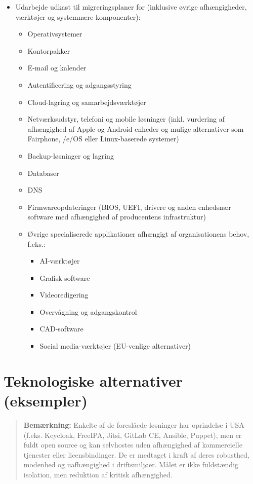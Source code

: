 \documentclass[a4paper,11pt,oneside]{book}
\def\tightlist{}
\begin{document}
\begin{itemize}
\item
  Udarbejde udkast til migreringsplaner for (inklusive øvrige
  afhængigheder, værktøjer og systemnære komponenter):

  \begin{itemize}
  \item
    Operativsystemer
  \item
    Kontorpakker
  \item
    E-mail og kalender
  \item
    Autentificering og adgangsstyring
  \item
    Cloud-lagring og samarbejdsværktøjer
  \item
    Netværksudstyr, telefoni og mobile løsninger (inkl. vurdering af
    afhængighed af Apple og Android enheder og mulige alternativer som
    Fairphone, /e/OS eller Linux-baserede systemer)
  \item
    Backup-løsninger og lagring
  \item
    Databaser
  \item
    DNS
  \item
    Firmwareopdateringer (BIOS, UEFI, drivere og anden enhedsnær
    software med afhængighed af producentens infrastruktur)
  \item
    Øvrige specialiserede applikationer afhængigt af organisationens
    behov, f.eks.:

    \begin{itemize}
    \tightlist
    \item
      AI-værktøjer
    \item
      Grafisk software
    \item
      Videoredigering
    \item
      Overvågning og adgangskontrol
    \item
      CAD-software
    \item
      Social media-værktøjer (EU-venlige alternativer)
    \end{itemize}
  \end{itemize}
\end{itemize}

\section{Teknologiske alternativer
(eksempler)}\label{teknologiske-alternativer-eksempler}

\begin{quote}
\textbf{Bemærkning:} Enkelte af de foreslåede løsninger har oprindelse i
USA (f.eks. Keycloak, FreeIPA, Jitsi, GitLab CE, Ansible, Puppet), men
er fuldt open source og kan selvhostes uden afhængighed af kommercielle
tjenester eller licensbindinger. De er medtaget i kraft af deres
robusthed, modenhed og uafhængighed i driftsmiljøer. Målet er ikke
fuldstændig isolation, men reduktion af kritisk afhængighed.
\end{quote}
\end{document}
